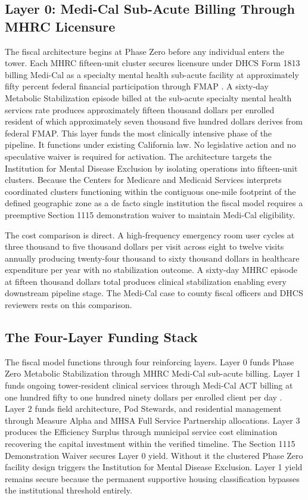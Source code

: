 \documentclass[12pt, letterpaper]{article}
\begin{document}
\subsection{Layer 0: Medi-Cal Sub-Acute Billing Through MHRC Licensure}

The fiscal architecture begins at Phase Zero before any individual enters the tower. Each MHRC fifteen-unit cluster secures licensure under DHCS Form 1813 billing Medi-Cal as a specialty mental health sub-acute facility at approximately fifty percent federal financial participation through FMAP \citep{dhcs_mhrc_2024, medi_cal_act_2024}. A sixty-day Metabolic Stabilization episode billed at the sub-acute specialty mental health services rate produces approximately fifteen thousand dollars per enrolled resident of which approximately seven thousand five hundred dollars derives from federal FMAP. This layer funds the most clinically intensive phase of the pipeline. It functions under existing California law. No legislative action and no speculative waiver is required for activation. The architecture targets the Institution for Mental Disease Exclusion by isolating operations into fifteen-unit clusters. Because the Centers for Medicare and Medicaid Services interprets coordinated clusters functioning within the contiguous one-mile footprint of the defined geographic zone as a de facto single institution \citep{cms_smd_imd_2017} the fiscal model requires a preemptive Section 1115 demonstration waiver to maintain Medi-Cal eligibility.

The cost comparison is direct. A high-frequency emergency room user cycles at three thousand to five thousand dollars per visit across eight to twelve visits annually producing twenty-four thousand to sixty thousand dollars in healthcare expenditure per year with no stabilization outcome. A sixty-day MHRC episode at fifteen thousand dollars total produces clinical stabilization enabling every downstream pipeline stage. The Medi-Cal case to county fiscal officers and DHCS reviewers rests on this comparison.

\subsection{The Four-Layer Funding Stack}

The fiscal model functions through four reinforcing layers. Layer 0 funds Phase Zero Metabolic Stabilization through MHRC Medi-Cal sub-acute billing. Layer 1 funds ongoing tower-resident clinical services through Medi-Cal ACT billing at one hundred fifty to one hundred ninety dollars per enrolled client per day \citep{medi_cal_act_2024}. Layer 2 funds field architecture, Pod Stewards, and residential management through Measure Alpha and MHSA Full Service Partnership allocations. Layer 3 produces the Efficiency Surplus through municipal service cost elimination recovering the capital investment within the verified timeline. The Section 1115 Demonstration Waiver secures Layer 0 yield. Without it the clustered Phase Zero facility design triggers the Institution for Mental Disease Exclusion. Layer 1 yield remains secure because the permanent supportive housing classification bypasses the institutional threshold entirely.
\end{document}

